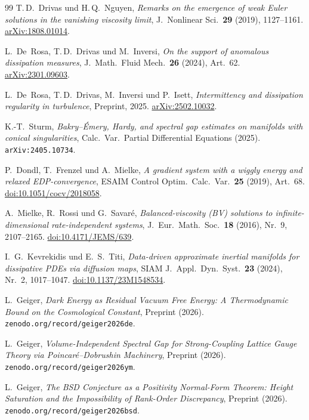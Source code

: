 \documentclass[12pt,a4paper]{article}
\theoremstyle{definition}
\theoremstyle{plain}
\theoremstyle{remark}
\begin{document}
\begin{thebibliography}{99}
T.\,D.~Drivas und H.\,Q.~Nguyen,
\emph{Remarks on the emergence of weak Euler solutions in the vanishing
viscosity limit},
J.~Nonlinear Sci.\ \textbf{29} (2019), 1127--1161.
\href{https://arxiv.org/abs/1808.01014}{arXiv:1808.01014}.

L.~De~Rosa, T.\,D.~Drivas und M.~Inversi,
\emph{On the support of anomalous dissipation measures},
J.~Math.\ Fluid Mech.\ \textbf{26} (2024), Art.~62.
\href{https://arxiv.org/abs/2301.09603}{arXiv:2301.09603}.

L.~De~Rosa, T.\,D.~Drivas, M.~Inversi und P.~Isett,
\emph{Intermittency and dissipation regularity in turbulence},
Preprint, 2025.
\href{https://arxiv.org/abs/2502.10032}{arXiv:2502.10032}.

K.-T.~Sturm, \emph{Bakry--\'Emery, Hardy, and spectral gap estimates on manifolds with conical singularities}, Calc.\ Var.\ Partial Differential Equations (2025). \texttt{arXiv:2405.10734}.

P.~Dondl, T.~Frenzel und A.~Mielke,
\emph{A gradient system with a wiggly energy and relaxed EDP-convergence},
ESAIM Control Optim.\ Calc.\ Var.\ \textbf{25} (2019), Art.~68.
\href{https://doi.org/10.1051/cocv/2018058}{doi:10.1051/cocv/2018058}.

A.~Mielke, R.~Rossi und G.~Savar\'e,
\emph{Balanced-viscosity (BV) solutions to infinite-dimensional rate-independent systems},
J.~Eur.\ Math.\ Soc.\ \textbf{18} (2016), Nr.~9, 2107--2165.
\href{https://doi.org/10.4171/JEMS/639}{doi:10.4171/JEMS/639}.

I.~G.~Kevrekidis und E.~S.~Titi,
\emph{Data-driven approximate inertial manifolds for dissipative PDEs via diffusion maps},
SIAM J.\ Appl.\ Dyn.\ Syst.\ \textbf{23} (2024), Nr.~2, 1017--1047.
\href{https://doi.org/10.1137/23M1548534}{doi:10.1137/23M1548534}.

L.~Geiger,
\emph{Dark Energy as Residual Vacuum Free Energy: A Thermodynamic Bound on the Cosmological Constant},
Preprint (2026). \texttt{zenodo.org/record/geiger2026de}.

L.~Geiger,
\emph{Volume-Independent Spectral Gap for Strong-Coupling Lattice Gauge Theory via Poincar\'e--Dobrushin Machinery},
Preprint (2026). \texttt{zenodo.org/record/geiger2026ym}.

L.~Geiger,
\emph{The BSD Conjecture as a Positivity Normal-Form Theorem: Height Saturation and the Impossibility of Rank-Order Discrepancy},
Preprint (2026). \texttt{zenodo.org/record/geiger2026bsd}.


\end{thebibliography}
\end{document}
